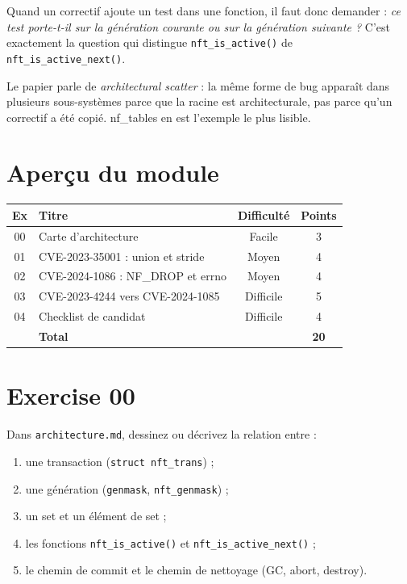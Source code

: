 \documentclass{training}
\begin{document}
Quand un correctif ajoute un test dans une fonction, il faut donc demander :
\emph{ce test porte-t-il sur la génération courante ou sur la génération
suivante ?} C'est exactement la question qui distingue
\texttt{nft\_is\_active()} de \texttt{nft\_is\_active\_next()}.

\begin{info}
Le papier parle de \emph{architectural scatter} : la même forme de bug
apparaît dans plusieurs sous-systèmes parce que la racine est
architecturale, pas parce qu'un correctif a été copié. nf\_tables en est
l'exemple le plus lisible.
\end{info}

\chapter{Aperçu du module}

\begin{center}
\begin{tabularx}{\linewidth}{|c|l|c|c|}
\hline
\textbf{Ex} & \textbf{Titre} & \textbf{Difficulté} & \textbf{Points} \\ \hline
00 & Carte d'architecture & Facile & 3 \\
01 & CVE-2023-35001 : union et stride & Moyen & 4 \\
02 & CVE-2024-1086 : NF\_DROP et errno & Moyen & 4 \\
03 & CVE-2023-4244 vers CVE-2024-1085 & Difficile & 5 \\
04 & Checklist de candidat & Difficile & 4 \\ \hline
& \textbf{Total} & & \textbf{20} \\ \hline
\end{tabularx}
\end{center}

\startexercices

\chapter{Exercise 00}
\makeheaderfiles

Dans \texttt{architecture.md}, dessinez ou décrivez la relation entre :

\begin{enumerate}
  \item une transaction (\texttt{struct nft\_trans}) ;
  \item une génération (\texttt{genmask}, \texttt{nft\_genmask}) ;
  \item un set et un élément de set ;
  \item les fonctions \texttt{nft\_is\_active()} et
        \texttt{nft\_is\_active\_next()} ;
  \item le chemin de commit et le chemin de nettoyage (GC, abort,
        destroy).
\end{enumerate}
\end{document}

